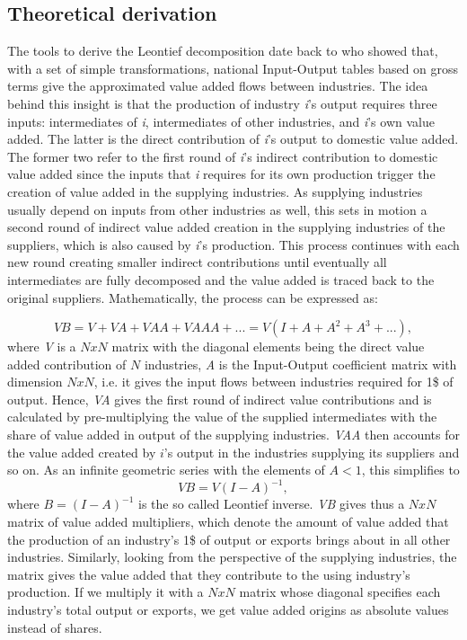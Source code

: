 \documentclass[a4paper,11pt]{article}
\begin{document}
\subsection{Theoretical derivation}
The tools to derive the Leontief decomposition date back to \citet{wale36} who showed that, with a set of simple transformations, national Input-Output tables based on gross terms give the approximated value added flows between industries. The idea behind this insight is that the production of industry \textit{i}'s output requires three inputs: intermediates of \textit{i}, intermediates of other industries, and \textit{i}'s own value added. The latter is the direct contribution of \textit{i}'s output to domestic value added. The former two refer to the first round of \textit{i}'s indirect contribution to domestic value added since the inputs that \textit{i} requires for its own production trigger the creation of value added in the supplying industries. As supplying industries usually depend on inputs from other industries as well, this sets in motion a second round of indirect value added creation in the supplying industries of the suppliers, which is also caused by \textit{i}'s production. This process continues with each new round creating smaller indirect contributions until eventually all intermediates are fully decomposed and the value added is traced back to the original suppliers. Mathematically, the process can be expressed as: 

\begin{equation}
VB = V + VA + VAA + VAAA + ... = V (I+A+A^{2}+A^{3}+...),
\end{equation}
where \textit{V} is a $N x N$ matrix with the diagonal elements being the direct value added contribution of $N$ industries, \textit{A} is the Input-Output coefficient matrix with dimension $N x N$, i.e. it gives the input flows between industries required for 1\$ of output. Hence, \emph{VA} gives the first round of indirect value contributions and is calculated by pre-multiplying the value of the supplied intermediates with the share of value added in output of the supplying industries. \emph{VAA} then accounts for the value added created by $i$'s output in the industries supplying its suppliers and so on.
As an infinite geometric series with the elements of $A<1$, this simplifies to
\begin{equation}
VB = V (I-A)^{-1},
\end{equation}
 where $B = (I-A)^{-1}$ is the so called Leontief inverse. \textit{VB} gives thus a $N x N$ matrix of value added multipliers, which denote the amount of value added that the production of an industry's 1\$ of output or exports brings about in all other industries.
Similarly, looking from the perspective of the supplying industries, the matrix gives the value added that they contribute to the using industry's production. If we multiply it with a $N x N$ matrix whose diagonal specifies each industry's total output or exports, we get value added origins as absolute values instead of shares.
\end{document}
